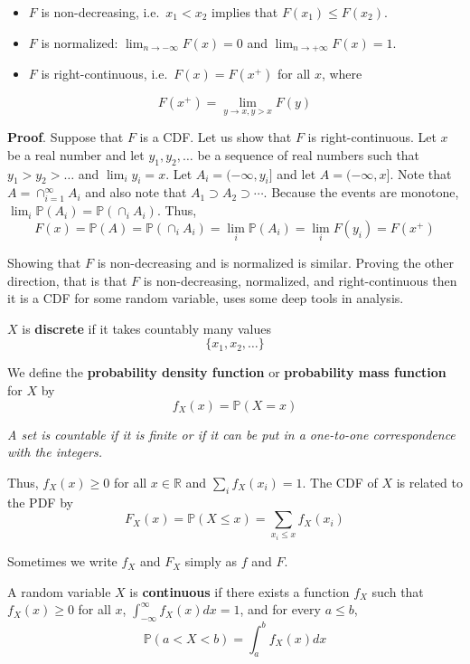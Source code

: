 \begin{itemize}[tightlist]
\item
  \(F\) is non-decreasing, i.e.~\(x_{1} < x_{2}\) implies that
  \(F(x_{1}) \leq F(x_{2})\).
\item
  \(F\) is normalized: \(\lim_{n \rightarrow -\infty} F(x) = 0\) and
  \(\lim_{n \rightarrow +\infty} F(x) = 1\).
\item
  \(F\) is right-continuous, i.e.~\(F(x) = F(x^+)\) for all \(x\), where
\end{itemize}

\[
F(x^+) = \lim_{y \rightarrow x, y > x} F(y)
\]

\textbf{Proof}. Suppose that \(F\) is a CDF. Let us show that \(F\) is right-continuous. Let \(x\) be a real number and let \(y_{1}, y_{2}, \dots\) be a sequence of real numbers such that \(y_{1} > y_{2} > \dots\) and \(\lim_{i} y_{i} = x\). Let \(A_{i} = (-\infty, y_{i}]\) and let \(A = (-\infty, x]\). Note that \(A = \cap_{i=1}^{\infty} A_{i}\) and also note that \(A_{1} \supset A_{2} \supset \cdots\). Because the events are monotone, \(\lim_{i} \mathbb{P}(A_{i}) = \mathbb{P}(\cap_{i} A_{i})\). Thus,
\[
F(x) = \mathbb{P}(A) = \mathbb{P}(\cap_{i} A_{i}) = \lim_{i} \mathbb{P}(A_{i}) = \lim_{i} F(y_{i}) = F(x^+)
\]

Showing that \(F\) is non-decreasing and is normalized is similar. Proving the other direction, that is that \(F\) is non-decreasing, normalized, and right-continuous then it is a CDF for some random variable, uses some deep tools in analysis.

\(X\) is \textbf{discrete} if it takes countably many values
\[
\{ x_{1}, x_{2}, \dots \}
\]

We define the \textbf{probability density function} or
\textbf{probability mass function} for \(X\) by
\[
f_X(x) = \mathbb{P}(X = x)
\]

\emph{A set is countable if it is finite or if it can be put in a one-to-one correspondence with the integers.}

Thus, \(f_X(x) \geq 0\) for all \(x \in \mathbb{R}\) and \(\sum_{i} f_X(x_{i}) = 1\). The CDF of \(X\) is related to the PDF by
\[
F_X(x) = \mathbb{P}(X \leq x) = \sum_{x_{i} \leq x} f_X(x_{i})
\]

Sometimes we write \(f_X\) and \(F_X\) simply as \(f\) and \(F\).

A random variable \(X\) is \textbf{continuous} if there exists a function \(f_X\) such that \(f_X(x) \geq 0\) for all \(x\), \(\int_{-\infty}^{\infty} f_X(x) dx = 1\), and for every \(a \leq b\),
\[
\mathbb{P}(a < X < b) = \int_a^{b} f_X(x) dx
\]

